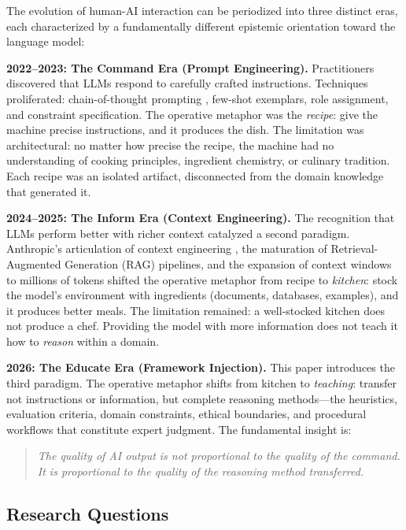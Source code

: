 \documentclass[12pt,a4paper]{article}
\begin{document}
The evolution of human-AI interaction can be periodized into three distinct eras, each characterized by a fundamentally different epistemic orientation toward the language model:

\textbf{2022--2023: The Command Era (Prompt Engineering).} Practitioners discovered that LLMs respond to carefully crafted instructions. Techniques proliferated: chain-of-thought prompting \cite{wei2022chain}, few-shot exemplars, role assignment, and constraint specification. The operative metaphor was the \emph{recipe}: give the machine precise instructions, and it produces the dish. The limitation was architectural: no matter how precise the recipe, the machine had no understanding of cooking principles, ingredient chemistry, or culinary tradition. Each recipe was an isolated artifact, disconnected from the domain knowledge that generated it.

\textbf{2024--2025: The Inform Era (Context Engineering).} The recognition that LLMs perform better with richer context catalyzed a second paradigm. Anthropic's articulation of context engineering \cite{anthropic2025context}, the maturation of Retrieval-Augmented Generation (RAG) pipelines, and the expansion of context windows to millions of tokens shifted the operative metaphor from recipe to \emph{kitchen}: stock the model's environment with ingredients (documents, databases, examples), and it produces better meals. The limitation remained: a well-stocked kitchen does not produce a chef. Providing the model with more information does not teach it how to \emph{reason} within a domain.

\textbf{2026: The Educate Era (Framework Injection).} This paper introduces the third paradigm. The operative metaphor shifts from kitchen to \emph{teaching}: transfer not instructions or information, but complete reasoning methods---the heuristics, evaluation criteria, domain constraints, ethical boundaries, and procedural workflows that constitute expert judgment. The fundamental insight is:

\begin{quote}
\emph{The quality of AI output is not proportional to the quality of the command. It is proportional to the quality of the reasoning method transferred.}
\end{quote}

\subsection{Research Questions}
\end{document}
